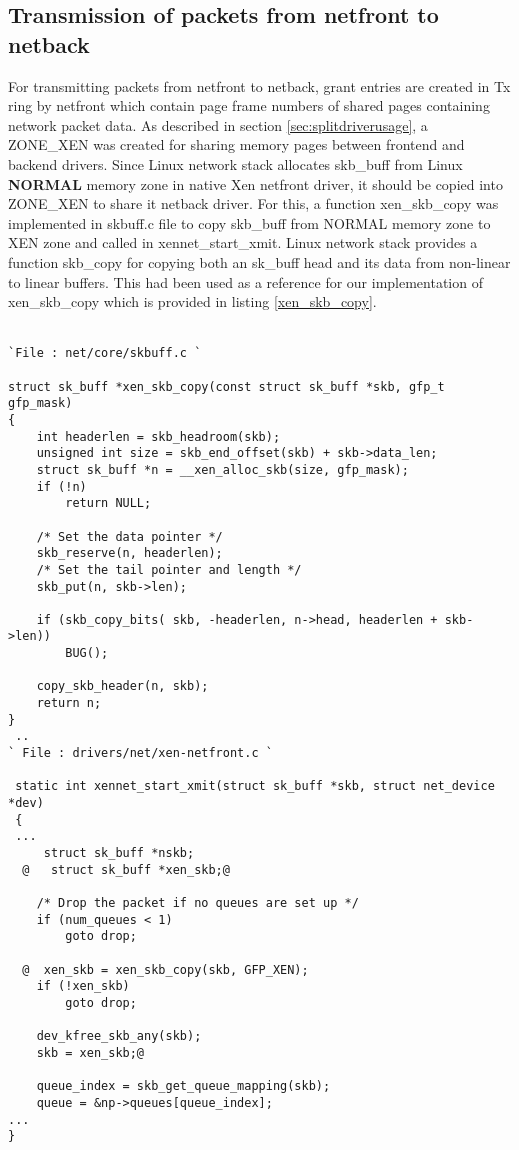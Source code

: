 \subsection{Transmission of packets from netfront to netback \label{sec:txnetfront}}
For transmitting packets from netfront to netback, grant entries are created in Tx ring by netfront which contain page frame numbers of shared pages containing network packet data. As described in section \ref{sec:splitdriverusage}, a ZONE\_XEN was created for sharing memory pages between frontend and backend drivers. Since Linux network stack allocates skb\_buff from Linux \textbf{NORMAL} memory zone in native Xen netfront driver, it should be copied into ZONE\_XEN to share it netback driver. For this, a function xen\_skb\_copy was implemented in skbuff.c file to copy skb\_buff from NORMAL memory zone to XEN zone  and called in xennet\_start\_xmit. Linux network stack provides a function skb\_copy for copying both an sk\_buff head and its data from non-linear to linear buffers. This had been used as a reference for our implementation of xen\_skb\_copy which is provided in listing \ref{xen_skb_copy}.
\\
\\
\begin{lstlisting}[caption=Code snippte of function xen\_skb\_copy for copying entire network packet from NORMAL memory zone to XEN memory zone and its invocation from xennet\_start\_xmit from ,label={xen_skb_copy},frame=single,style=base]
`File : net/core/skbuff.c `

struct sk_buff *xen_skb_copy(const struct sk_buff *skb, gfp_t gfp_mask)
{
    int headerlen = skb_headroom(skb);
    unsigned int size = skb_end_offset(skb) + skb->data_len;
    struct sk_buff *n = __xen_alloc_skb(size, gfp_mask);
    if (!n)
        return NULL;

    /* Set the data pointer */
    skb_reserve(n, headerlen);
    /* Set the tail pointer and length */
    skb_put(n, skb->len);

    if (skb_copy_bits( skb, -headerlen, n->head, headerlen + skb->len))
        BUG();

    copy_skb_header(n, skb);
    return n;
}
 ..
` File : drivers/net/xen-netfront.c `
 
 static int xennet_start_xmit(struct sk_buff *skb, struct net_device *dev)
 {
 ...
     struct sk_buff *nskb;
  @   struct sk_buff *xen_skb;@

    /* Drop the packet if no queues are set up */
    if (num_queues < 1)
        goto drop;
        
  @  xen_skb = xen_skb_copy(skb, GFP_XEN);
    if (!xen_skb)
        goto drop;
 
    dev_kfree_skb_any(skb);
    skb = xen_skb;@

    queue_index = skb_get_queue_mapping(skb);
    queue = &np->queues[queue_index];
...
}

\end{lstlisting}

